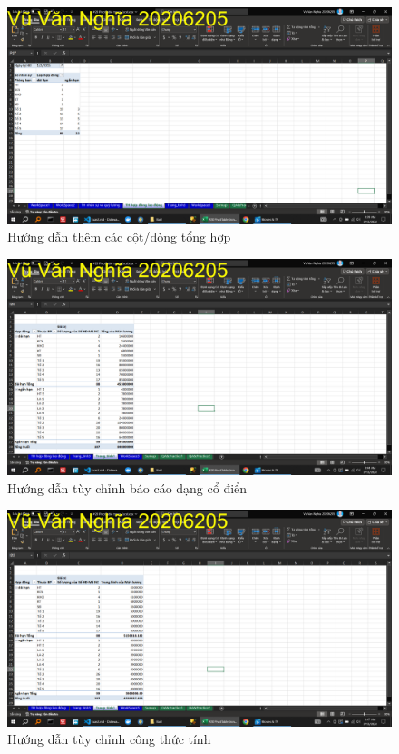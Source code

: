 \documentclass{article}
\begin{document}
\begin{figure}[H]
\centering
\includegraphics[scale = 0.15]{Bai1/HuongDan/5.png}
\caption{Hướng dẫn thêm các cột/dòng tổng hợp}
\end{figure}

\begin{figure}[H]
\centering
\includegraphics[scale = 0.15]{Bai1/HuongDan/6.png}
\caption{Hướng dẫn tùy chỉnh báo cáo dạng cổ điển}
\end{figure}

\begin{figure}[H]
\centering
\includegraphics[scale = 0.15]{Bai1/HuongDan/7.png}
\caption{Hướng dẫn tùy chỉnh công thức tính}
\end{figure}
\end{document}
